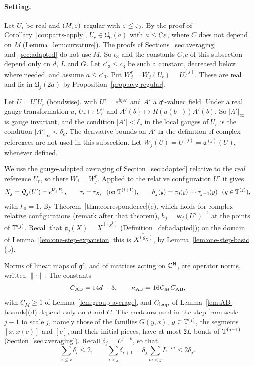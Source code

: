 \paragraph{Setting.} Let $U_r$ be real and $(M,\varepsilon)$-regular with $\varepsilon\le\varepsilon_0$. By the proof of Corollary~\ref{cor:parts-apply}, $U_r\in\mathfrak U_0(a)$ with $a\le C\varepsilon$, where $C$ does not depend on $M$ (Lemma~\ref{lem:curvature}). The proofs of Sections~\ref{sec:averaging} and~\ref{sec:adapted} do not use $M$. So $c_3$ and the constants $C,c$ of this subsection depend only on $d$, $L$ and $G$. Let $c'_3\le c_3$ be such a constant, decreased below where needed, and assume $a\le c'_3$. Put $W^r_j=W_j(U_r)=U_r^{(j)}$. These are real and lie in $\mathfrak U_j(2a)$ by Proposition~\ref{prop:avg-regular}.

Let $U=U'U_r$ (bondwise), with $U'=e^{\ii\eta A'}$ and $A'$ a $\mathfrak g^c$-valued field. Under a real gauge transformation $u$, $U_r\mapsto U_r^u$ and $A'(b)\mapsto R(u(b_-))A'(b)$. So $|A'|_\infty$ is gauge invariant, and the condition $|A'|<\delta_c$ in the local gauges of $U_r$ is the condition $|A'|_\infty<\delta_c$. The derivative bounds on $A'$ in the definition of complex references are not used in this subsection. Let $W_j(U)=U^{(j)}=\mathfrak a^{(j)}(U)$, whenever defined.

We use the gauge-adapted averaging of Section~\ref{sec:adapted} relative to the \emph{real} reference $U_r$, so there $W_j=W^r_j$. Applied to the relative configuration $U'$ it gives
\[
X_j=\mathcal Q_j(U')=e^{\ii\delta_jB_j},\qquad \tau_i=\tau_{X_i}\ \ (\text{on }\T^{(i+1)}),\qquad h_j(y)=\tau_0(y)\cdots\tau_{j-1}(y)\ \ (y\in\T^{(j)}),
\]
with $h_0=1$. By Theorem~\ref{thm:correspondence}(c), which holds for complex relative configurations (remark after that theorem), $h_j=\mathsf w_j(U')^{-1}$ at the points of $\mathbb T^{(j)}$. Recall that $\tilde{\mathfrak a}_j(X)=\overline X^{(\tau_X^{-1})}$ (Definition~\ref{def:adapted}); on the domain of Lemma~\ref{lem:one-step-expansion} this is $\overline{X^{(g_X)}}$, by Lemma~\ref{lem:one-step-basic}(b).

Norms of linear maps of $\mathfrak g^c$, and of matrices acting on $\mathbb C^{\mathsf N}$, are operator norms, written $\|\cdot\|$. The constants
\[
C_{\rm AB}=14d+3,\qquad\kappa_{\rm AB}=16C_MC_{\rm AB},
\]
with $C_M\ge1$ of Lemma~\ref{lem:group-average}, and $C_{\rm loop}$ of Lemma~\ref{lem:AB-bounds}(d) depend only on $d$ and $G$. The contours used in the step from scale $j-1$ to scale $j$, namely those of the families $G(y,x)$, $y\in\mathbb T^{(j)}$, the segments $[x,x(c)]$ and $[c]$, and their initial pieces, have at most $2L$ bonds of $\mathbb T^{(j-1)}$ (Section~\ref{sec:averaging}). Recall $\delta_j=L^{j-k}$, so that
\begin{equation}\label{eq:AB-scales}
\sum_{i\le k}\delta_i\le2,\qquad\sum_{i<j}\delta_{i+1}=\delta_j\sum_{m<j}L^{-m}\le2\delta_j .
\end{equation}

